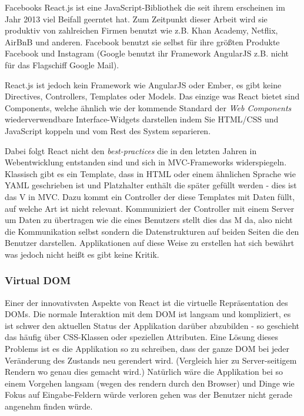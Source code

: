 \documentclass[12pt,twoside]{book}
\begin{document}
Facebooks React.js\cite{react} ist eine JavaScript-Bibliothek die seit ihrem erscheinen im Jahr 2013 viel Beifall geerntet hat. Zum Zeitpunkt dieser Arbeit wird sie produktiv von zahlreichen Firmen benutzt wie z.B. Khan Academy\cite{khan}, Netflix\cite{netflix}, AirBnB\cite{airbnb} und anderen. Facebook benutzt sie selbst für ihre größten Produkte Facebook und Instagram (Google benutzt ihr Framework AngularJS z.B. nicht für das Flagschiff Google Mail).

React.js ist jedoch kein Framework wie AngularJS oder Ember, es gibt keine Directives, Controllers, Templates oder Models. Das einzige was React bietet sind Components, welche ähnlich wie der kommende Standard der \textit{Web Components}\cite{webcomponents} wiederverwendbare Interface-Widgets darstellen indem Sie HTML/CSS und JavaScript koppeln und vom Rest des System separieren.

Dabei folgt React nicht den \textit{best-practices} die in den letzten Jahren in Webentwicklung entstanden sind und sich in MVC-Frameworks widerspiegeln. Klassisch gibt es ein Template, dass in HTML oder einem ähnlichen Sprache wie YAML geschrieben ist und Platzhalter enthält die später gefüllt werden - dies ist das V in MVC.
Dazu kommt ein Controller der diese Templates mit Daten füllt, auf welche Art ist nicht relevant. Kommuniziert der Controller mit einem Server um Daten zu übertragen wie die eines Benutzers stellt dies das M da, also nicht die Kommunikation selbst sondern die Datenstrukturen auf beiden Seiten die den Benutzer darstellen.
Applikationen auf diese Weise zu erstellen hat sich bewährt was jedoch nicht heißt es gibt keine Kritik.

\subsubsection{Virtual DOM}

Einer der innovativsten Aspekte von React ist die virtuelle Repräsentation des DOMs\cite{DOM}. Die normale Interaktion mit dem DOM ist langsam und kompliziert, es ist schwer den aktuellen Status der Applikation darüber abzubilden - so geschieht das häufig über CSS-Klassen oder speziellen Attributen.
Eine Lösung dieses Problems ist es die Applikation so zu schreiben, dass der ganze DOM bei jeder Veränderung des Zustands neu gerendert wird. (Vergleich hier zu Server-seitigem Rendern wo genau dies gemacht wird.) Natürlich wäre die Applikation bei so einem Vorgehen langsam (wegen des rendern durch den Browser) und Dinge wie Fokus auf Eingabe-Feldern würde verloren gehen was der Benutzer nicht gerade angenehm finden würde.
\end{document}
